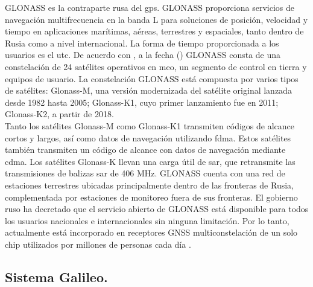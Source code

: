 \begin{justify}
    GLONASS es la contraparte rusa del \gls{gps}. GLONASS proporciona servicios de navegación multifrecuencia en la banda L para soluciones de posición, velocidad y tiempo
    en aplicaciones marítimas, aéreas, terrestres y espaciales, tanto dentro de Rusia como a nivel internacional. La forma de tiempo proporcionada a los usuarios es el \gls{utc}.
    De acuerdo con \textcite{glonass_iac}, a la fecha () GLONASS consta de una constelación de 24 satélites operativos en \gls{meo}, un segmento de control en tierra y equipos de usuario. La constelación GLONASS
    está compuesta por varios tipos de satélites: Glonass-M, una versión modernizada del satélite original lanzada desde 1982 hasta 2005; Glonass-K1, cuyo primer
    lanzamiento fue en 2011; Glonass-K2, a partir de 2018.\\
    
    Tanto los satélites Glonass-M como Glonass-K1 transmiten códigos de alcance cortos y largos, así como datos de navegación utilizando \gls{fdma}. Estos satélites también
    transmiten un código de alcance con datos de navegación mediante \gls{cdma}. Los satélites Glonass-K llevan una carga útil de \gls{sar}, que retransmite las
    transmisiones de balizas \gls{sar} de 406 MHz. GLONASS cuenta con una red de estaciones terrestres
    ubicadas principalmente dentro de las fronteras de Rusia, complementada por estaciones de monitoreo fuera de sus fronteras. El gobierno ruso ha decretado que el servicio abierto
    de GLONASS está disponible para todos los usuarios nacionales e internacionales sin ninguna limitación. Por lo tanto, actualmente está incorporado en receptores GNSS
    multiconstelación de un solo chip utilizados por millones de personas cada día \parencite{kaplan2017understanding}.
\end{justify}

\subsection*{\fontsize{12}{18}\selectfont Sistema Galileo.}

